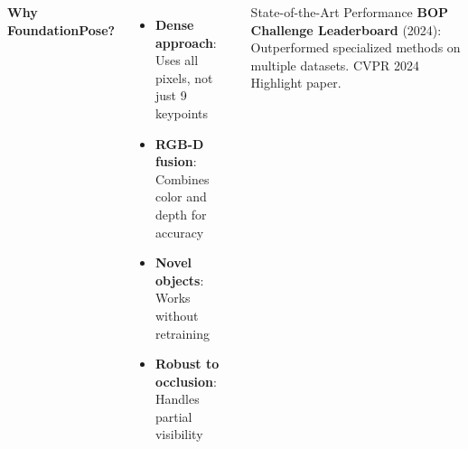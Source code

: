 \documentclass[serif, aspectratio=169, 9pt]{beamer}
\begin{document}
\begin{frame}
\begin{center}
    \end{center}
    \vspace{0.4em}
    \begin{columns}
        \textbf{Why FoundationPose?}
        \begin{itemize}
            \item \textbf{Dense approach}: Uses all pixels, not just 9 keypoints
            \item \textbf{RGB-D fusion}: Combines color and depth for accuracy
            \item \textbf{Novel objects}: Works without retraining
            \item \textbf{Robust to occlusion}: Handles partial visibility
        \end{itemize}
        \vspace{0.3em}
        \begin{block}{State-of-the-Art Performance}
            \footnotesize
            \textbf{BOP Challenge Leaderboard} (2024): Outperformed specialized methods on multiple datasets. CVPR 2024 Highlight paper.

\end{block}
\end{columns}
\end{frame}
\end{document}
